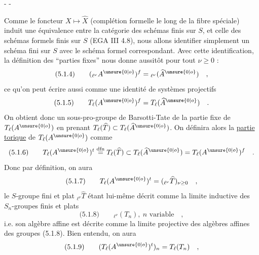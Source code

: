 \begin{center}-  -\end{center}

Comme le foncteur $X\longmapsto\widehat X$ (complétion formelle le long de la fibre spéciale) induit une équivalence entre la catégorie des schémas finis sur $S$, et celle des schémas formels finis sur $S$ (EGA III 4.8), nous allons identifier simplement un schéma fini sur $S$ avec le schéma formel correspondant. Avec cette identification, la définition des ``parties fixes'' nous donne aussitôt pour tout $\nu\geq0$ :
\[
\text{(5.1.4)}\qquad ({}_{\ell^\nu}A^{\unsure{0|o}})^f={}_{\ell^\nu}(\widehat A^{\unsure{0|o}})\quad ,
\]
ce qu'on peut écrire aussi comme une identité de systèmes projectifs
\[
\text{(5.1.5)}\qquad T_\ell(A^{\unsure{0|o}})^f=T_\ell(\widehat A^{\unsure{0|o}})\quad .
\]
On obtient donc un sous-pro-groupe de Barsotti-Tate de la partie fixe de $T_\ell(A^{\unsure{0|o}})$ en prenant $T_\ell(\widehat T)\subset T_\ell(\widehat A^{\unsure{0|o}})$. On définira alors la \uline{partie torique} de $T_\ell(A^{\unsure{0|o}})$ comme
\[
\text{(5.1.6)}\qquad T_\ell(A^{\unsure{0|o}})^t\overset{\mathrm{dfn}}=T_\ell(\widehat T)\subset T_\ell(\widehat A^{\unsure{0|o}})=T_\ell(A^{\unsure{0|o}})^f\quad .
\]
Donc par définition, on aura
\[
\text{(5.1.7)}\qquad T_\ell(A^{\unsure{0|o}})^t=({}_{\ell^\nu}\widehat T)_{\nu\geq0}\quad ,
\]
le $S$-groupe fini et plat ${}_{\ell^\nu}\widehat T$ étant lui-même décrit comme la limite inductive des $S_n$-groupes finis et plats
\[
\text{(5.1.8)}\qquad {}_{\ell^\nu}(T_n),\ n\text{ variable}\quad ,
\]
i.e. son algèbre affine est décrite comme la limite projective des algèbres affines des groupes (5.1.8). Bien entendu, on aura
\[
\text{(5.1.9)}\qquad (T_\ell(A^{\unsure{0|o}})^t)_n=T_\ell(T_n)\quad ,
\]
